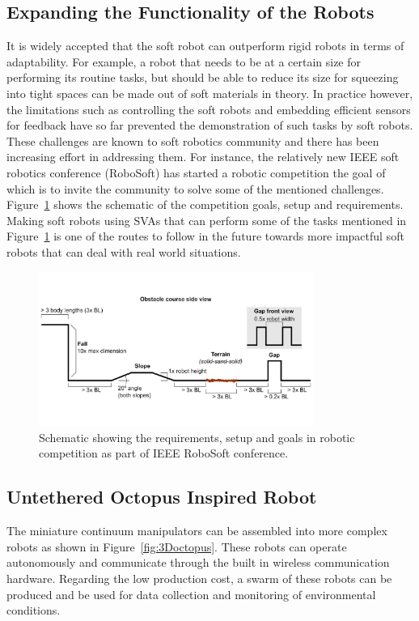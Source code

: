 \subsection{Expanding the Functionality of the Robots}
It is widely accepted that the soft robot can outperform rigid robots in terms of adaptability. For example, a robot that needs to be at a certain size for performing its routine tasks, but should be able to reduce its size for squeezing into tight spaces can be made out of soft materials in theory. In practice however, the limitations such as controlling the soft robots and embedding efficient sensors for feedback have so far prevented the demonstration of such tasks by soft robots. These challenges are known to soft robotics community and there has been increasing effort in addressing them. For instance, the relatively new IEEE soft robotics conference (RoboSoft) has started a robotic competition the goal of which is to invite the community to solve some of the mentioned challenges. Figure~\ref{fig:sorocomp} shows the schematic of the competition goals, setup and requirements. Making soft robots using SVAs that can perform some of the tasks mentioned in Figure~\ref{fig:sorocomp} is one of the routes to follow in the future towards more impactful soft robots that can deal with real world situations. 
\begin{figure}[!t]
\centering
\includegraphics[width=0.8\textwidth]{sorocomp.pdf}
    \caption[]{Schematic showing the requirements, setup and goals in robotic competition as part of IEEE RoboSoft conference.}
    \label{fig:sorocomp}
\end{figure}

\subsection{Untethered Octopus Inspired Robot}
The miniature continuum manipulators can be assembled into more complex robots as shown in Figure~\ref{fig:3Doctopus}. These robots can operate autonomously and communicate through the built in wireless communication hardware. Regarding the low production cost, a swarm of these robots can be produced and be used for data collection and monitoring of environmental conditions. 

